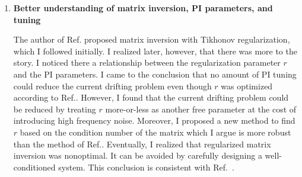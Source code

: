 \begin{enumerate}


\item {\bf Better understanding of matrix inversion, PI parameters, and tuning} 

The author of Ref.\cite{bea} proposed matrix inversion with Tikhonov regularization, which I followed initially. I realized later, however, that there was more to the story. I noticed there a relationship between the regularization parameter $r$ and the PI parameters. I came to the conclusion that no amount of PI tuning could reduce the current drifting problem even though $r$ was optimized according to Ref.\cite{bea}.  However, I found that the current drifting problem could be reduced by treating $r$ more-or-less as another free parameter at the cost of introducing high frequency noise. Moreover, I proposed a new method to find $r$ based on the condition number of the matrix which I argue is more robust than the method of Ref.\cite{bea}. Eventually, I realized that regularized matrix inversion was nonoptimal. It can be avoided by carefully designing a well-conditioned system. This conclusion is consistent with Ref.~\cite{rawlikpriv}. 


\end{enumerate}
